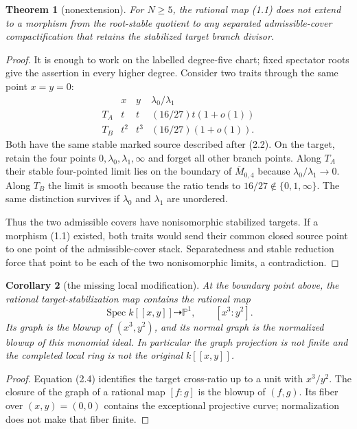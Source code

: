 \documentclass[11pt]{article}
\newtheorem{theorem}{Theorem}[section]
\newtheorem{corollary}[theorem]{Corollary}
\newcommand{\Mbar}{\overline{M}}
\newcommand{\Spec}{\operatorname{Spec}}
\begin{document}
\begin{theorem}[nonextension]\label{thm:no-arrow}
For $N\geq5$, the rational map (1.1) does not extend to a morphism from the
root-stable quotient to any separated admissible-cover compactification that
retains the stabilized target branch divisor.
\end{theorem}

\begin{proof}
It is enough to work on the labelled degree-five chart; fixed spectator roots
give the assertion in every higher degree.  Consider two traits through the
same point $x=y=0$:
\[
 \begin{array}{c|cc|c}
 &x&y&\lambda_0/\lambda_1\\ \hline
 T_A&t&t& (16/27)t(1+o(1))\\
 T_B&t^2&t^3& (16/27)(1+o(1)).
 \end{array}                                          \tag{2.6}
\]
Both have the same stable marked source described after (2.2).  On the
target, retain the four points $0,\lambda_0,\lambda_1,\infty$ and forget all
other branch points.  Along $T_A$ their stable four-pointed limit lies on the
boundary of $\Mbar_{0,4}$ because $\lambda_0/\lambda_1\to0$.  Along $T_B$
the limit is smooth because the ratio tends to $16/27\notin\{0,1,\infty\}$.
The same distinction survives if $\lambda_0$ and $\lambda_1$ are unordered.

Thus the two admissible covers have nonisomorphic stabilized targets.  If a
morphism (1.1) existed, both traits would send their common closed source
point to one point of the admissible-cover stack.  Separatedness and stable
reduction force that point to be each of the two nonisomorphic limits, a
contradiction.
\end{proof}

\begin{corollary}[the missing local modification]\label{cor:blowup}
At the boundary point above, the rational target-stabilization map contains
the rational map
\[
 \Spec k[[x,y]]\dashrightarrow\mathbb P^1,
 \qquad [x^3:y^2].                                   \tag{2.7}
\]
Its graph is the blowup of $(x^3,y^2)$, and its normal graph is the
normalized blowup of this monomial ideal.  In particular the graph
projection is not finite and the completed local ring is not the original
$k[[x,y]]$.
\end{corollary}

\begin{proof}
Equation (2.4) identifies the target cross-ratio up to a unit with
$x^3/y^2$.  The closure of the graph of a rational map $[f:g]$ is the blowup
of $(f,g)$.  Its fiber over $(x,y)=(0,0)$ contains the exceptional projective
curve; normalization does not make that fiber finite.
\end{proof}
\end{document}
